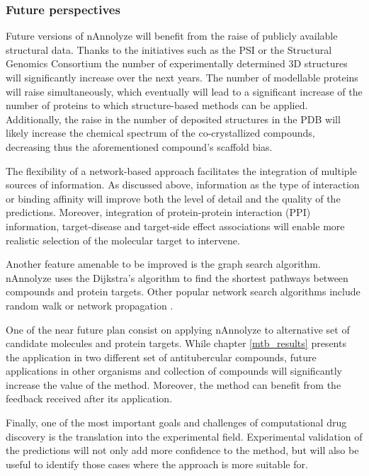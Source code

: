 \documentclass[12pt, b5paper,twoside]{tesi_upf}
\begin{document}
  
  
\subsubsection{Future perspectives}

 \par Future versions of nAnnolyze will benefit from the raise of publicly available structural data. Thanks to the initiatives such as the PSI \cite{Norvell2007} or the Structural Genomics Consortium \cite{GIleadi2007} the number of experimentally determined 3D structures will significantly increase over the next years. The number of modellable proteins will raise simultaneously, which eventually will lead to a significant increase of the number of proteins to which structure-based methods can be applied. Additionally, the raise in the number of deposited structures in the PDB will likely increase the chemical spectrum of the co-crystallized compounds, decreasing thus the aforementioned compound's scaffold bias.
  
 \par The flexibility of a network-based approach facilitates the integration of multiple sources of information. As discussed above, information as the type of interaction or binding affinity will improve both the level of detail and the quality of the predictions. Moreover, integration of protein-protein interaction (PPI) information, target-disease and target-side effect associations will enable more realistic selection of the molecular target to intervene. 
 
 \par Another feature amenable to be improved is the graph search algorithm. nAnnolyze uses the Dijkstra's algorithm \cite{Dijkstra1959} to find the shortest pathways between compounds and protein targets. Other popular network search algorithms include random walk \cite{Chen2012} or network propagation \cite{Huang2013a}.
 \par One of the near future plan consist on applying nAnnolyze to alternative set of candidate molecules and protein targets. While chapter \ref{mtb_results} presents the application in two different set of antitubercular compounds, future applications in other organisms and collection of compounds will significantly increase the value of the method. Moreover, the method can benefit from the feedback received after its application. 
 \par Finally, one of the most important goals and challenges of computational drug discovery is the translation into the experimental field. Experimental validation of the predictions will not only add more confidence to the method, but will also be useful to identify those cases where the approach is more suitable for.          
\end{document}
